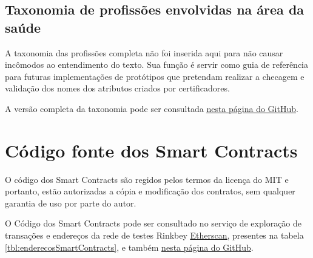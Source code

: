 \documentclass[a4paper,11pt]{article}
\newcommand{\link}[2]{{\color{blue}\underline{\href{#1}{#2}}}}
\begin{document}
\subsection{Taxonomia de profissões envolvidas na área da saúde}

A taxonomia das profissões completa não foi inserida aqui para não causar incômodos ao entendimento do texto.
Sua função é servir como guia de referência para futuras implementações de protótipos que pretendam realizar a checagem e validação dos nomes dos atributos criados por certificadores.

A versão completa da taxonomia pode ser consultada \link{https://github.com/brunoarruda/PGC/blob/master/recursos/taxonomia/README.md}{nesta página do GitHub}.


\newpage
\section{Código fonte dos Smart Contracts}
\label{app:codigoSmartContracts}

O código dos Smart Contracts são regidos pelos termos da licença do MIT e portanto, estão autorizadas a cópia e modificação dos contratos, sem qualquer garantia de uso por parte do autor.

O Código dos Smart Contracts pode ser consultado no serviço de exploração de transações e endereços da rede de testes Rinkbey \link{https://rinkeby.etherscan.io/}{Etherscan}, presentes na tabela \ref{tbl:enderecosSmartContracts}, e também \link{https://github.com/brunoarruda/PGC/blob/master/recursos/Smart-Contracts/README.md}{nesta página do GitHub}.
\end{document}
